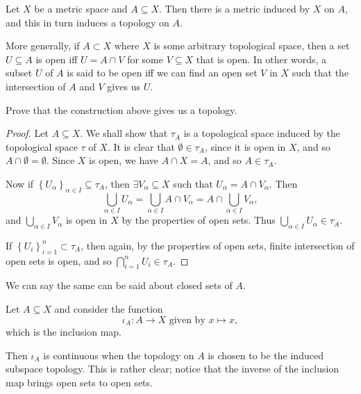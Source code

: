 \documentclass[notoc,notitlepage]{tufte-book}
\begin{document}
Let $X$ be a metric space and $A \subseteq X$. Then there is a metric induced by
$X$ on $A$, and this in turn induces a topology on $A$.

More generally, if $A \subset X$ where $X$ is some arbitrary topological space,
then a set $U \subseteq A$ is open iff $U = A \cap V$ for some $V \subseteq X$
that is open. In other words, a subset $U$ of $A$ is said to be open iff we can
find an open set $V$ in $X$ such that the intersection of $A$ and $V$ gives us
$U$.

\begin{ex}
  Prove that the construction above gives us a topology.
\end{ex}

\begin{proof}
  Let $A \subseteq X$. We shall show that $\tau_A$ is a topological space induced
  by the topological space $\tau$ of $X$. It is clear that $\emptyset \in \tau_A$,
  since it is open in $X$, and so $A \cap \emptyset = \emptyset$. Since $X$ is open,
  we have $A \cap X = A$, and so $A \in \tau_A$.

  Now if $\left\{ U_\alpha \right\}_{\alpha \in I} \subseteq \tau_A$, then
  $\exists V_\alpha \subseteq X$ such that $U_\alpha = A \cap V_\alpha$. Then
  \begin{equation*}
    \bigcup_{\alpha \in I} U_\alpha = \bigcup_{\alpha \in I} A \cap V_\alpha
      = A \cap \bigcup_{\alpha \in I} V_\alpha,
  \end{equation*}
  and $\bigcup_{\alpha \in I} V_\alpha$ is open in $X$ by the properties of open
  sets. Thus $\bigcup_{\alpha \in I} U_\alpha \in \tau_A$.

  If $\left\{ U_i \right\}_{i = 1}^{n} \subset \tau_A$, then again, by the properties
  of open sets, finite intersection of open sets is open, and so $\bigcap_{i=1}^{n} U_i \in \tau_A$.

  
\end{proof}

\begin{note}
  We can say the same can be said about closed sets of $A$.
\end{note}

\begin{eg}
  Let $A \subseteq X$ and consider the function
  \begin{equation*}
    \iota_A : A \to X \text{ given by } x \mapsto x,
  \end{equation*}
  which is the inclusion map.

  Then $\iota_A$ is continuous when the topology on $A$ is chosen to be the
  induced subspace topology. This is rather clear; notice that the inverse
  of the inclusion map brings open sets to open sets.
\end{eg}
\end{document}
